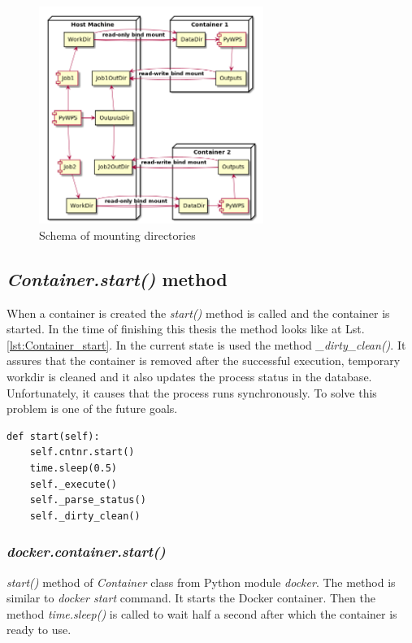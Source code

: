 \documentclass[12pt,a4paper]{article}
\begin{document}
\begin{figure}[h!]
\centering
\includegraphics[width=0.65\textwidth]{img/Diag_mount.png}
\caption{Schema of mounting directories}
\label{fig:Diag_mount}
\end{figure}

\subsection{\textit{Container.start()} method}
When a container is created the \textit{start()} method is called and the container is started.
In the time of finishing this thesis the method looks like at Lst.\ref{lst:Container_start}. In the current state is used the method
\textit{\_dirty\_clean()}. It assures that the container is removed after the successful execution, temporary workdir is cleaned and it also 
updates the process status in the database. Unfortunately, it causes that the process runs synchronously. To solve this problem is one of the
future goals.
 
\begin{lstlisting}[basicstyle=\small,caption={\textit{Container.create()} method},label={lst:Container_start}]
def start(self):
    self.cntnr.start()
    time.sleep(0.5)
    self._execute()
    self._parse_status()
    self._dirty_clean()
\end{lstlisting}

\subsubsection{\textit{docker.container.start()}}
\textit{start()} method of \textit{Container} class from Python module \textit{docker}. The method is similar to \textit{docker start} command. 
It starts the Docker container. Then the method \textit{time.sleep()} is called to wait half a second after which the container is ready to 
use.
\end{document}

